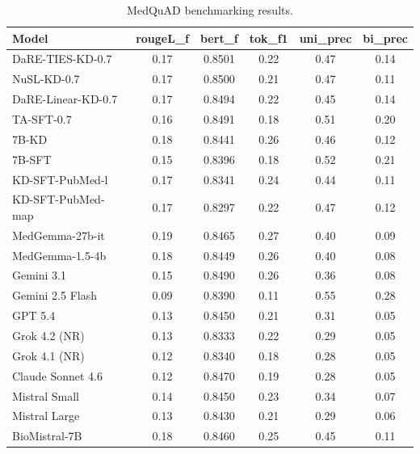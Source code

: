 \documentclass[conference]{IEEEtran}
\begin{document}
\begin{table}[h!]
    \centering
    \begin{minipage}[h]{0.48\textwidth}
        \centering
        \caption{MedQuAD benchmarking results.}
        \label{tab:medquad_bench}
        \scriptsize
        \begin{tabular}{lccccc}
        \toprule
        \textbf{Model} & \textbf{rougeL\_f} & \textbf{bert\_f} & \textbf{tok\_f1} & \textbf{uni\_prec} & \textbf{bi\_prec} \\
        \midrule
        DaRE-TIES-KD-0.7       & 0.17 & 0.8501 & 0.22 & 0.47 & 0.14 \\
        NuSL-KD-0.7            & 0.17 & 0.8500 & 0.21 & 0.47 & 0.11 \\
        DaRE-Linear-KD-0.7     & 0.17 & 0.8494 & 0.22 & 0.45 & 0.14 \\
        TA-SFT-0.7             & 0.16 & 0.8491 & 0.18 & 0.51 & 0.20 \\
        7B-KD                  & 0.18 & 0.8441 & 0.26 & 0.46 & 0.12 \\
        7B-SFT                 & 0.15 & 0.8396 & 0.18 & 0.52 & 0.21 \\
        KD-SFT-PubMed-l        & 0.17 & 0.8341 & 0.24 & 0.44 & 0.11 \\
        KD-SFT-PubMed-map      & 0.17 & 0.8297 & 0.22 & 0.47 & 0.12 \\
        MedGemma-27b-it        & 0.19 & 0.8465 & 0.27 & 0.40 & 0.09 \\
        MedGemma-1.5-4b        & 0.18 & 0.8449 & 0.26 & 0.40 & 0.08 \\
        Gemini 3.1             & 0.15 & 0.8490 & 0.26 & 0.36 & 0.08 \\
        Gemini 2.5 Flash       & 0.09 & 0.8390 & 0.11 & 0.55 & 0.28 \\
        GPT 5.4                & 0.13 & 0.8450 & 0.21 & 0.31 & 0.05 \\
        Grok 4.2 (NR)          & 0.13 & 0.8333 & 0.22 & 0.29 & 0.05 \\
        Grok 4.1 (NR)          & 0.12 & 0.8340 & 0.18 & 0.28 & 0.05 \\
        Claude Sonnet 4.6      & 0.12 & 0.8470 & 0.19 & 0.28 & 0.05 \\
        Mistral Small          & 0.14 & 0.8450 & 0.23 & 0.34 & 0.07 \\
        Mistral Large          & 0.13 & 0.8430 & 0.21 & 0.29 & 0.06 \\
        BioMistral-7B          & 0.18 & 0.8460 & 0.25 & 0.45 & 0.11 \\

\end{tabular}
\end{minipage}
\end{table}
\end{document}
